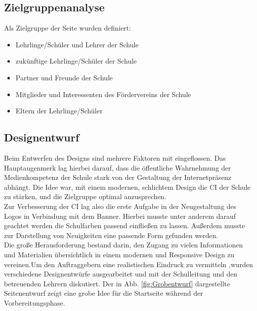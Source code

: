 \subsection{Zielgruppenanalyse}
\label{sec:Zielgruppenanalyse}
Als Zielgruppe der Seite wurden definiert:
\begin{itemize}
	\item{Lehrlinge/Sch\"uler und Lehrer der Schule}
	\item{zuk\"unftige Lehrlinge/Sch\"uler der Schule}
	\item{Partner und Freunde der Schule}
	\item{Mitglieder und Interessenten des F\"ordervereins der Schule}
	\item{Eltern der Lehrlinge/Sch\"uler}
\end{itemize}

\subsection{Designentwurf}
\label{sec:Designentwurf}
Beim Entwerfen des Designs sind mehrere Faktoren mit eingeflossen. Das Hauptaugenmerk
lag hierbei darauf, dass die \"offentliche Wahrnehmung der Medienkompetenz der Schule
stark von der Gestaltung der Internetpr\"asenz abh\"angt.
Die Idee war, mit einem modernen, schlichtem Design die \acs{CI} der Schule zu st\"arken, 
und die Zielgruppe optimal anzusprechen.\\
Zur Verbesserung der \acs{CI} lag also die erste Aufgabe in der Neugestaltung des 
Logos in Verbindung mit dem Banner. Hierbei musste unter anderem darauf 
geachtet werden die Schulfarben passend einflie\ss{}en zu lassen.
Au\ss{}erdem musste zur Darstellung von Neuigkeiten eine passende Form gefunden 
werden.\\
Die gro\ss{}e Herausforderung bestand darin, den Zugang zu vielen Informationen und Materialien 
\"ubersichtlich in einem modernen und \acs{Responsive Design} zu vereinen.Um den Auftraggebern 
eine realistischen Eindruck zu vermitteln ,wurden verschiedene Designentw\"urfe ausgearbeitet 
und mit der Schulleitung und den betreuenden Lehrern diskutiert. Der in Abb. \ref{fig:Grobentwurf} 
dargestellte Seitenentwurf zeigt eine grobe Idee f\"ur die Startseite w\"ahrend der Vorbereitungsphase.

